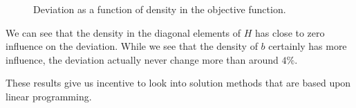 \begin{figure}[ht!]
\begin{center}
    
\end{center}
\caption{Deviation as a function of density in the objective function.}
\label{fig:sparsobj}
\end{figure}

We can see that the density in the diagonal elements of $H$ has
close to zero influence on the deviation.
While we see that the density of $b$ certainly has more influence,
the deviation actually never change more than around $4\%$.

These results give us incentive to look into solution methods that
are based upon linear programming.
